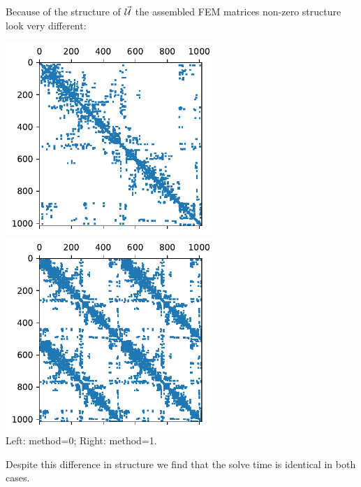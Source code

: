 Because of the structure of $\vec{\cal U}$ the assembled FEM matrices 
non-zero structure look very different:
\begin{center}
\includegraphics[width=8cm]{python_codes/fieldstone_179/RESULTS/matrix0.pdf}
\includegraphics[width=8cm]{python_codes/fieldstone_179/RESULTS/matrix1.pdf}\\
{\captionfont Left: method=0; Right: method=1.}
\end{center}
Despite this difference in structure we find that the solve time is identical
in both cases.



